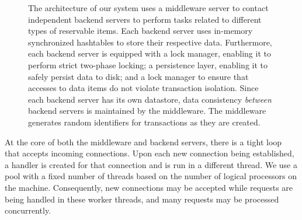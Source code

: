 \documentclass[letterpaper,11pt]{article}
\begin{document}
\begin{figure}[H]

    \caption{
        The architecture of our system uses a middleware server to contact
        independent backend servers to perform tasks related to different types
        of reservable items. Each backend server uses in-memory synchronized
        hashtables to store their respective data. Furthermore, each backend
        server is equipped with a lock manager, enabling it to perform strict
        two-phase locking; a persistence layer, enabling it to safely persist
        data to disk; and a lock manager to ensure that accesses to data items
        do not violate transaction isolation. Since each backend server has its
        own datastore, data consistency \emph{between} backend servers is
        maintained by the middleware. The middleware generates random
        identifiers for transactions as they are created.
    }
\end{figure}

At the core of both the middleware and backend servers, there is a tight loop
that accepts incoming connections. Upon each new connection being established,
a handler is created for that connection and is run in a different thread. We
use a pool with a fixed number of threads based on the number of logical
processors on the machine. Consequently, new connections may be accepted while
requests are being handled in these worker threads, and many requests may be
processed concurrently.
\end{document}
